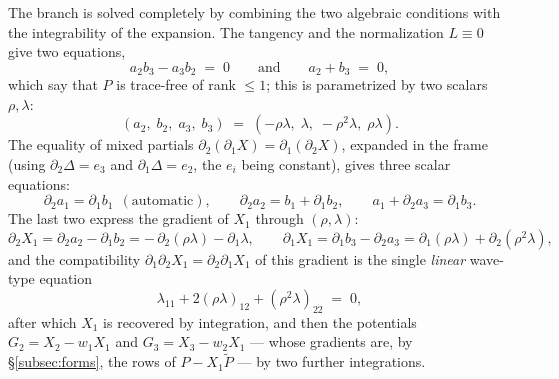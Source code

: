 \documentclass[11pt]{article}
\theoremstyle{plain}
\theoremstyle{definition}
\theoremstyle{remark}
\begin{document}
The branch is solved completely by combining the two algebraic conditions with
the integrability of the expansion. The tangency and the normalization
$L\equiv0$ give two equations,
\[
a_2b_3-a_3b_2\;=\;0
\qquad\text{and}\qquad
a_2+b_3\;=\;0 ,
\]
which say that $P$ is trace-free of rank $\le1$; this is parametrized by two
scalars $\rho,\lambda$:
\[
(a_2,\;b_2,\;a_3,\;b_3)\;=\;(-\rho\lambda,\;\lambda,\;-\rho^2\lambda,\;\rho\lambda).
\]
The equality of mixed partials $\partial_2(\partial_1X)=\partial_1(\partial_2X)$,
expanded in the frame (using $\partial_2\Delta=e_3$ and $\partial_1\Delta=e_2$,
the $e_i$ being constant), gives three scalar equations:
\[
\partial_2a_1=\partial_1b_1\ \ (\text{automatic}),\qquad
\partial_2a_2=b_1+\partial_1b_2,\qquad
a_1+\partial_2a_3=\partial_1b_3 .
\]
The last two express the gradient of $X_1$ through $(\rho,\lambda)$:
\[
\partial_2X_1=\partial_2a_2-\partial_1b_2=-\,\partial_2(\rho\lambda)-\partial_1\lambda,
\qquad
\partial_1X_1=\partial_1b_3-\partial_2a_3=\partial_1(\rho\lambda)+\partial_2(\rho^2\lambda),
\]
and the compatibility $\partial_1\partial_2X_1=\partial_2\partial_1X_1$ of this
gradient is the single \emph{linear} wave-type equation
\begin{equation}\label{eq:wave}
\lambda_{11}+2(\rho\lambda)_{12}+(\rho^2\lambda)_{22}\;=\;0 ,
\end{equation}
after which $X_1$ is recovered by integration,
and then the potentials
$G_2=X_2-w_1X_1$ and $G_3=X_3-w_2X_1$ --- whose gradients are, by
\S\ref{subsec:forms}, the rows of $P-X_1\widetilde P$ --- by two further
integrations.
\end{document}
